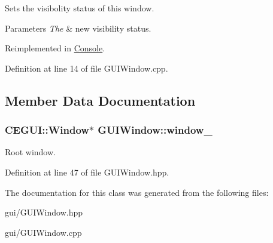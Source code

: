 Sets the visibolity status of this window. 


\begin{DoxyParams}{Parameters}
{\em The} & new visibility status. \\
\hline
\end{DoxyParams}


Reimplemented in \hyperlink{class_console_a501dafcea40b76808dec9fce5817f54a}{Console}.



Definition at line 14 of file G\+U\+I\+Window.\+cpp.



\subsection{Member Data Documentation}
\subsubsection[{\texorpdfstring{window\+\_\+}{window_}}]{\setlength{\rightskip}{0pt plus 5cm}C\+E\+G\+U\+I\+::\+Window$\ast$ G\+U\+I\+Window\+::window\+\_\+\hspace{0.3cm}{\ttfamily [protected]}}\hypertarget{class_g_u_i_window_ad977cc2d82b049b76ed62920123c1691}{}\label{class_g_u_i_window_ad977cc2d82b049b76ed62920123c1691}


Root window. 



Definition at line 47 of file G\+U\+I\+Window.\+hpp.



The documentation for this class was generated from the following files\+:\begin{DoxyCompactItemize}
\item 
gui/G\+U\+I\+Window.\+hpp\item 
gui/G\+U\+I\+Window.\+cpp\end{DoxyCompactItemize}
